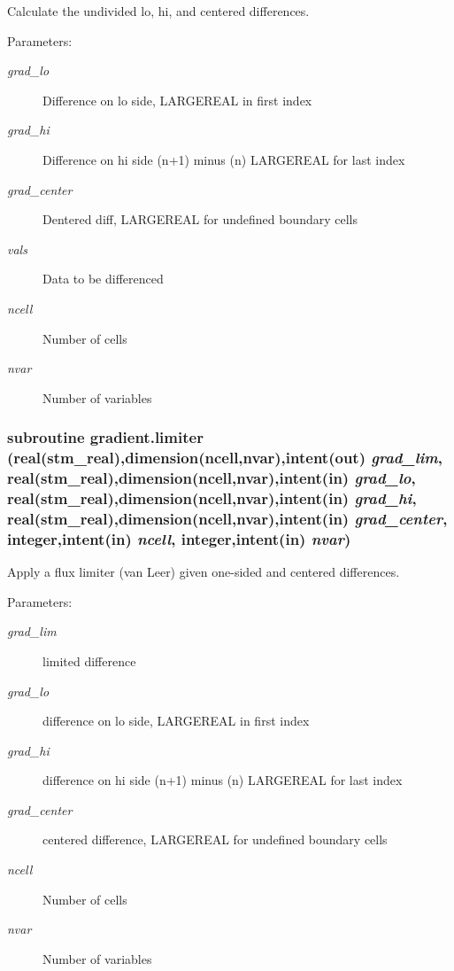 Calculate the undivided lo, hi, and centered differences. 

\begin{Desc}
\item[Parameters:]
\begin{description}
\item[{\em grad\_\-lo}]Difference on lo side, LARGEREAL in first index\item[{\em grad\_\-hi}]Difference on hi side (n+1) minus (n) LARGEREAL for last index\item[{\em grad\_\-center}]Dentered diff, LARGEREAL for undefined boundary cells\item[{\em vals}]Data to be differenced\item[{\em ncell}]Number of cells\item[{\em nvar}]Number of variables \end{description}
\end{Desc}
\hypertarget{a00061_64ad308bd281dd6315a927bf0f9721da}{
\subsubsection[{limiter}]{\setlength{\rightskip}{0pt plus 5cm}subroutine gradient.limiter (real(stm\_\-real),dimension(ncell,nvar),intent(out) {\em grad\_\-lim}, \/  real(stm\_\-real),dimension(ncell,nvar),intent(in) {\em grad\_\-lo}, \/  real(stm\_\-real),dimension(ncell,nvar),intent(in) {\em grad\_\-hi}, \/  real(stm\_\-real),dimension(ncell,nvar),intent(in) {\em grad\_\-center}, \/  integer,intent(in) {\em ncell}, \/  integer,intent(in) {\em nvar})}}
\label{a00061_64ad308bd281dd6315a927bf0f9721da}


Apply a flux limiter (van Leer) given one-sided and centered differences. 

\begin{Desc}
\item[Parameters:]
\begin{description}
\item[{\em grad\_\-lim}]limited difference\item[{\em grad\_\-lo}]difference on lo side, LARGEREAL in first index\item[{\em grad\_\-hi}]difference on hi side (n+1) minus (n) LARGEREAL for last index\item[{\em grad\_\-center}]centered difference, LARGEREAL for undefined boundary cells \item[{\em ncell}]Number of cells\item[{\em nvar}]Number of variables \end{description}
\end{Desc}
